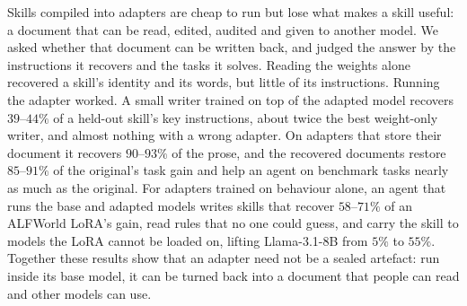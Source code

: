 \documentclass[11pt]{article}
\begin{document}
Skills compiled into adapters are cheap to run but lose what makes a skill useful: a document that can be read, edited, audited and given to
another model. We asked whether that document can be written back, and judged the answer by the instructions it recovers and the tasks it
solves. Reading the weights alone recovered a skill's identity and its words, but little of its instructions. Running the adapter worked. A
small writer trained on top of the adapted model recovers $39$--$44\%$ of a held-out skill's key instructions, about twice the best weight-only writer, and almost nothing with a wrong adapter. On adapters that store their document it recovers $90$--$93\%$ of the prose, and
the recovered documents restore $85$--$91\%$ of the original's task gain and help an agent on benchmark tasks nearly as much as the original.
For adapters trained on behaviour alone, an agent that runs the base and adapted models writes skills that recover $58$--$71\%$ of an ALFWorld
LoRA's gain, read rules that no one could guess, and carry the skill to models the LoRA cannot be loaded on, lifting Llama-3.1-8B from $5\%$
to $55\%$. Together these results show that an adapter need not be a sealed artefact: run inside its base model, it can be turned back into a
document that people can read and other models can use.
\end{document}
